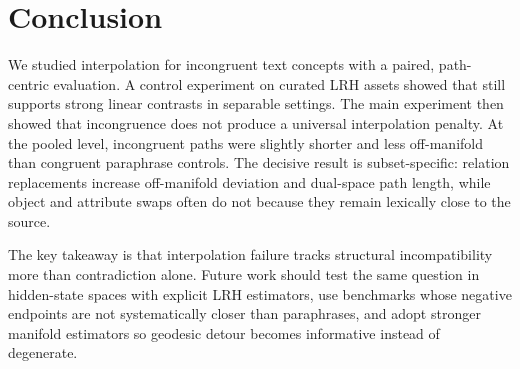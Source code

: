 \section{Conclusion}
\label{sec:conclusion}

We studied interpolation for incongruent text concepts with a paired, path-centric evaluation. A control experiment on curated LRH assets showed that \embmodel still supports strong linear contrasts in separable settings. The main experiment then showed that incongruence does not produce a universal interpolation penalty. At the pooled level, incongruent paths were slightly shorter and less off-manifold than congruent paraphrase controls. The decisive result is subset-specific: relation replacements increase off-manifold deviation and dual-space path length, while object and attribute swaps often do not because they remain lexically close to the source.

The key takeaway is that interpolation failure tracks structural incompatibility more than contradiction alone. Future work should test the same question in hidden-state spaces with explicit LRH estimators, use benchmarks whose negative endpoints are not systematically closer than paraphrases, and adopt stronger manifold estimators so geodesic detour becomes informative instead of degenerate.
